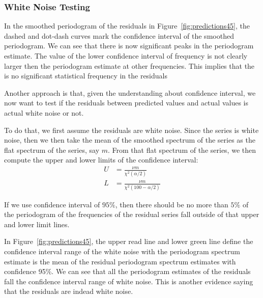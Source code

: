 \documentclass[12pt]{article}
\begin{document}
\subsubsection{White Noise Testing}
In the smoothed periodogram of the residuals in Figure~\ref{fig:predictions45},
the dashed and dot-dash curves mark the confidence interval of the smoothed
periodogram. We can see that there is now significant peaks in the periodogram
estimate. The value of the lower confidence interval of frequency is not clearly
larger then the periodogram estimate at other frequencies. This implies that the
is no significant statistical frequency in the residuals~\cite{CryerTimeSeries}

Another approach is that, given the understanding about confidence interval, we
now want to test if the residuals between predicted values and actual values is
actual white noise or not.

To do that, we first assume the residuals are white noise. Since the series is
white noise, then we then take the mean of the smoothed spectrum of the series
as the flat spectrum of the series, say $m$. From that flat spectrum of the
series, we then compute the upper and lower limits of the confidence interval:
\begin{align}
U &= \frac{\nu m}{\chi^2(\alpha/2)}\\
L &= \frac{\nu m}{\chi^2(100-\alpha/2)}
\end{align}

If we use confidence interval of $95\%$, then there should be no more than $5\%$
of the periodogram of the frequencies of the residual series fall outside of
that upper and lower limit lines.

In Figure~\ref{fig:predictions45}, the upper read line and lower green line
define the confidence interval range of the white noise with the periodogram
spectrum estimate is the mean of the residual periodogram spectrum estimates with
confidence 95\%. We can see that all the periodogram estimates of the residuals
fall the confidence interval range of white noise. This is another evidence
saying that the residuals are indead white noise.

\end{document}
